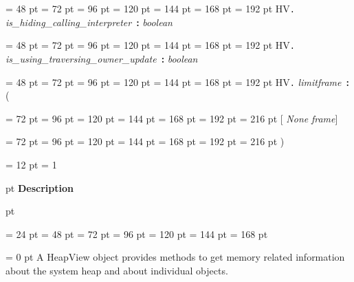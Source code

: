 {{{{\par \noindent  \leftskip = 48 pt  \leftmargini = 72 pt  \leftmarginii = 96 pt  \leftmarginiii = 120 pt  \leftmarginiv = 144 pt  \leftmarginv = 168 pt  \leftmarginvi = 192 pt HV{\large {\tt .\/} {\em is{\_}hiding{\_}calling{\_}interpreter\/}}~{\bf :}  {\em boolean\/}\par}
{\par \noindent  \leftskip = 48 pt  \leftmargini = 72 pt  \leftmarginii = 96 pt  \leftmarginiii = 120 pt  \leftmarginiv = 144 pt  \leftmarginv = 168 pt  \leftmarginvi = 192 pt HV{\large {\tt .\/} {\em is{\_}using{\_}traversing{\_}owner{\_}update\/}}~{\bf :}  {\em boolean\/}\par}
{\par \noindent  \leftskip = 48 pt  \leftmargini = 72 pt  \leftmarginii = 96 pt  \leftmarginiii = 120 pt  \leftmarginiv = 144 pt  \leftmarginv = 168 pt  \leftmarginvi = 192 pt HV{\large {\tt .\/} {\em limitframe\/}}~{\bf :}  ({\par \noindent
{\par \noindent  \leftskip = 72 pt  \leftmargini = 96 pt  \leftmarginii = 120 pt  \leftmarginiii = 144 pt  \leftmarginiv = 168 pt  \leftmarginv = 192 pt  \leftmarginvi = 216 pt {\bf {}\/}{[} {\em None\/}{\bf {}\/} {\em frame\/}]\par}
{\par \noindent  \leftskip = 72 pt  \leftmargini = 96 pt  \leftmarginii = 120 pt  \leftmarginiii = 144 pt  \leftmarginiv = 168 pt  \leftmarginv = 192 pt  \leftmarginvi = 216 pt  )\par}
\par}
\par}
\par}
\par}
{\par \pagebreak[3.300000] \noindent \hangindent = 12 pt \hangafter = 1 
{\par \pagebreak[3]  pt \noindent
{\Large {\bf Description\/}}\par {} pt
} \noindent
\par}
{\par \noindent  \leftskip = 24 pt  \leftmargini = 48 pt  \leftmarginii = 72 pt  \leftmarginiii = 96 pt  \leftmarginiv = 120 pt  \leftmarginv = 144 pt  \leftmarginvi = 168 pt {\par \parindent = 0 pt 
A HeapView object provides methods to get memory related information
about the system heap and about individual objects.
}}}
